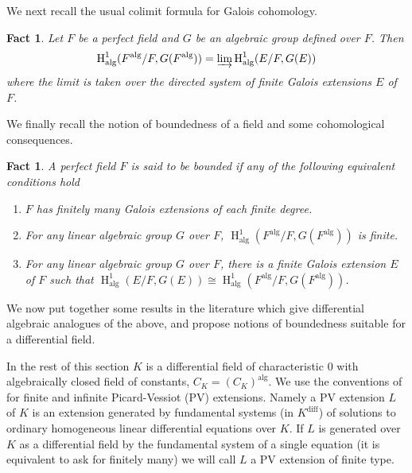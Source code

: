 \documentclass{amsart}
\newtheorem{fact}[theorem]{Fact}
\theoremstyle{definition}
\theoremstyle{remark}
\numberwithin{equation}{section}
\def \HH {\operatorname{H}}
\def \diff {\operatorname{diff}}
\def \alg {\operatorname{alg}}
\begin{document}
We next recall the usual colimit formula for Galois cohomology. 

\begin{fact}\label{fact: alg colim}\cite{Serre1979}
    Let $F$ be a perfect field and $G$ be an algebraic group defined over $F$. Then $$\HH^1_{\alg}(F^{\alg}/F,G(F^{\alg})) = \varinjlim \HH^1_{\alg}(E/F,G(E))$$ where the limit is taken over the directed system of finite Galois extensions $E$ of $F$.
\end{fact}

We finally recall the notion of boundedness of a field and some cohomological consequences.

\begin{fact}\cite{Serre1979}
    A perfect field $F$ is said to be bounded if any of the following equivalent conditions hold

    \begin{enumerate}
        \item $F$ has finitely many Galois extensions of each finite degree. 
        \item For any linear algebraic group $G$ over $F$, $\HH^1_{\alg}(F^{\alg}/F,G(F^{\alg}))$ is finite.
        \item For any linear algebraic group $G$ over $F$, there is a finite Galois extension $E$ of $F$ such that  $\HH^1_{\alg}(E/F,G(E))\cong \HH^1_{\alg}(F^{\alg}/F,G(F^{\alg}))$.
    \end{enumerate}
\end{fact}

We now put together some results in the literature which give differential algebraic analogues of the above, and propose notions of boundedness suitable for a differential field.

In the rest of this section $K$ is a differential field of characteristic $0$ with algebraically closed field of constants, $C_K = (C_K)^{\alg}$. We use the conventions of \cite{meretzky2026galoistheoryautomorphismgroups} for finite and infinite Picard-Vessiot (PV) extensions. Namely a PV extension $L$ of $K$ is an extension generated by fundamental systems (in $K^{\diff}$) of solutions to ordinary homogeneous linear differential equations over $K$. If $L$ is generated over $K$ as a differential field by the fundamental system of a single equation (it is equivalent to ask for finitely many) we will call $L$ a PV extension of finite type. 
\end{document}
